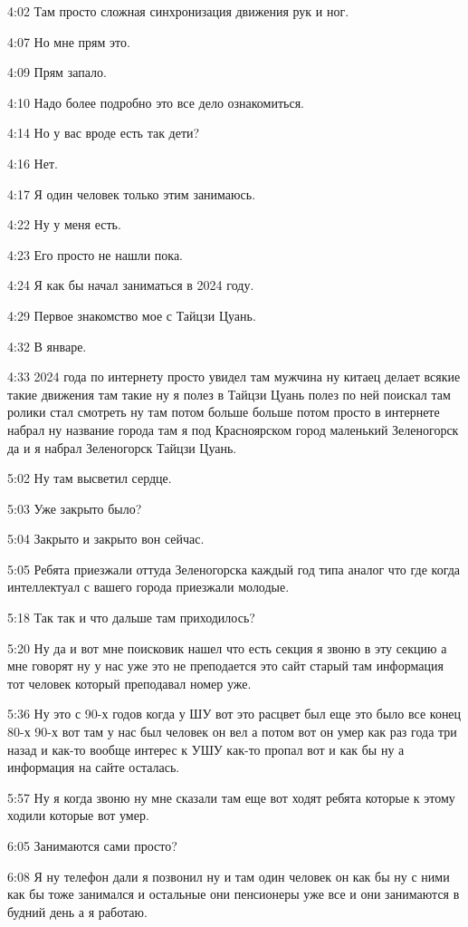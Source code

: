 4:02
Там просто сложная синхронизация движения рук и ног.

4:07
Но мне прям это.

4:09
Прям запало.

4:10
Надо более подробно это все дело ознакомиться.

4:14
Но у вас вроде есть так дети?

4:16
Нет.

4:17
Я один человек только этим занимаюсь.

4:22
Ну у меня есть.

4:23
Его просто не нашли пока.

4:24
Я как бы начал заниматься в 2024 году.

4:29
Первое знакомство мое с Тайцзи Цуань.

4:32
В январе.

4:33
2024 года по интернету просто увидел там мужчина ну китаец делает всякие такие движения там такие ну я полез в Тайцзи Цуань полез по ней поискал там ролики стал смотреть ну там потом больше больше потом просто в интернете набрал ну название города там я под Красноярском город маленький Зеленогорск да и я набрал Зеленогорск Тайцзи Цуань.

5:02
Ну там высветил сердце.

5:03
Уже закрыто было?

5:04
Закрыто и закрыто вон сейчас.

5:05
Ребята приезжали оттуда Зеленогорска каждый год типа аналог что где когда интеллектуал с вашего города приезжали молодые.

5:18
Так так и что дальше там приходилось?

5:20
Ну да и вот мне поисковик нашел что есть секция я звоню в эту секцию а мне говорят ну у нас уже это не преподается это сайт старый там информация тот человек который преподавал номер уже.

5:36
Ну это с 90-х годов когда у ШУ вот это расцвет был еще это было все конец 80-х 90-х вот там у нас был человек он вел а потом вот он умер как раз года три назад и как-то вообще интерес к УШУ как-то пропал вот и как бы ну а информация на сайте осталась.

5:57
Ну я когда звоню ну мне сказали там еще вот ходят ребята которые к этому ходили которые вот умер.

6:05
Занимаются сами просто?

6:08
Я ну телефон дали я позвонил ну и там один человек он как бы ну с ними как бы тоже занимался и остальные они пенсионеры уже все и они занимаются в будний день а я работаю.

